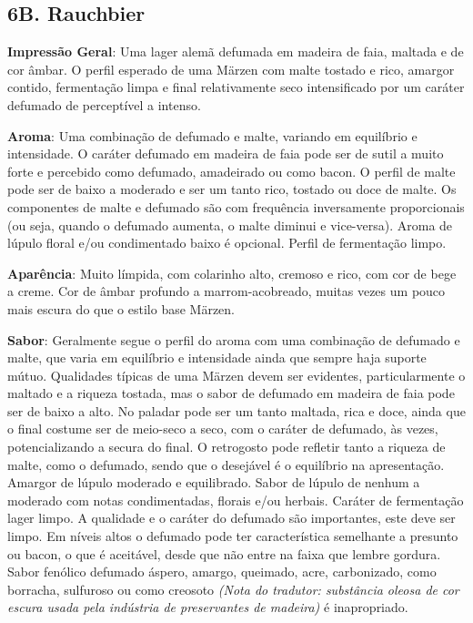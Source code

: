 \subsection*{6B. Rauchbier}
\textbf{Impressão Geral}: Uma lager alemã defumada em madeira de faia, maltada e de cor âmbar. O perfil esperado de uma Märzen com malte tostado e rico, amargor contido, fermentação limpa e final relativamente seco intensificado por um caráter defumado de perceptível a intenso.

\textbf{Aroma}: Uma combinação de defumado e malte, variando em equilíbrio e intensidade. O caráter defumado em madeira de faia pode ser de sutil a muito forte e percebido como defumado, amadeirado ou como bacon. O perfil de malte pode ser de baixo a moderado e ser um tanto rico, tostado ou doce de malte. Os componentes de malte e defumado são com frequência inversamente proporcionais (ou seja, quando o defumado aumenta, o malte diminui e vice-versa). Aroma de lúpulo floral e/ou condimentado baixo é opcional. Perfil de fermentação limpo.

\textbf{Aparência}: Muito límpida, com colarinho alto, cremoso e rico, com cor de bege a creme. Cor de âmbar profundo a marrom-acobreado, muitas vezes um pouco mais escura do que o estilo base Märzen.

\textbf{Sabor}: Geralmente segue o perfil do aroma com uma combinação de defumado e malte, que varia em equilíbrio e intensidade ainda que sempre haja suporte mútuo. Qualidades típicas de uma Märzen devem ser evidentes, particularmente o maltado e a riqueza tostada, mas o sabor de defumado em madeira de faia pode ser de baixo a alto. No paladar pode ser um tanto maltada, rica e doce, ainda que o final costume ser de meio-seco a seco, com o caráter de defumado, às vezes, potencializando a secura do final. O retrogosto pode refletir tanto a riqueza de malte, como o defumado, sendo que o desejável é o equilíbrio na apresentação. Amargor de lúpulo moderado e equilibrado. Sabor de lúpulo de nenhum a moderado com notas condimentadas, florais e/ou herbais. Caráter de fermentação lager limpo. A qualidade e o caráter do defumado são importantes, este deve ser limpo. Em níveis altos o defumado pode ter característica semelhante a presunto ou bacon, o que é aceitável, desde que não entre na faixa que lembre gordura. Sabor fenólico defumado áspero, amargo, queimado, acre, carbonizado, como borracha, sulfuroso ou como creosoto \textit{(Nota do tradutor: substância oleosa de cor escura usada pela indústria de preservantes de madeira)} é inapropriado.

